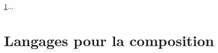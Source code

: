 
      \ref{sec:lang-de-comp}...

      


  \section{Langages pour la composition}
  \label{sec:lang-de-comp}





